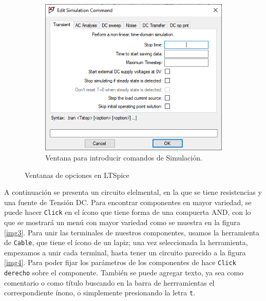 \documentclass[a4paper]{article} %
\begin{document}
\begin{figure}
\begin{subfigure}[b]{0.45\textwidth}
		\includegraphics[scale=0.5]{IMAGENES/img5} %
		\caption{Ventana para introducir comandos de Simulación.} %
		\label{img5}
	\end{subfigure}
	\caption{Ventanas de opciones en LTSpice}
	\label{westminster}
\end{figure}


A continuación se presenta un circuito elelmental, en la que se tiene resistencias y una fuente de Tensión DC. Para encontrar componentes en mayor variedad, se puede hacer \texttt{Click} en el ícono que tiene forma de una compuerta AND, con lo que se mostrará un menú con mayor variedad como se muestra en la figura \eqref{img3}. Para unir las terminales de nuestros componentes, usamos la herramienta de \texttt{Cable}, que tiene el ícono de un lapiz; una vez seleccionada la herramienta, empezamos a unir cada terminal, hasta tener un circuito parecido a la figura \eqref{img4}. Para poder fijar los parámetros de los componentes de hace \texttt{Click derecho} sobre el componente. También se puede agregar texto, ya sea como comentario o como título buscando en la barra de herrramientas el correspondiente ínono, o simplemente presionando la letra \texttt{t}.
\end{document}
